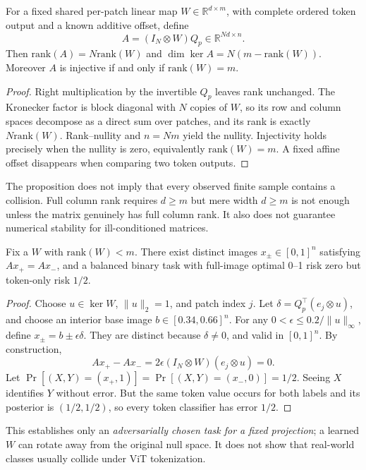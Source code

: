 \begin{proposition}\label{prop:rank}
For a fixed shared per-patch linear map $W\in\mathbb R^{d\times m}$, with complete ordered token output and a known additive offset, define
\begin{equation}\label{eq:operator}
 A=(I_N\otimes W)Q_p\in\mathbb R^{Nd\times n}.
\end{equation}
Then $\mathrm{rank}(A)=N\mathrm{rank}(W)$ and $\dim\ker A=N(m-\mathrm{rank}(W))$. Moreover $A$ is injective if and only if $\mathrm{rank}(W)=m$.
\end{proposition}
\begin{proof}
Right multiplication by the invertible $Q_p$ leaves rank unchanged. The Kronecker factor is block diagonal with $N$ copies of $W$, so its row and column spaces decompose as a direct sum over patches, and its rank is exactly $N\mathrm{rank}(W)$. Rank--nullity and $n=Nm$ yield the nullity. Injectivity holds precisely when the nullity is zero, equivalently $\mathrm{rank}(W)=m$. A fixed affine offset disappears when comparing two token outputs.
\end{proof}
The proposition does not imply that every observed finite sample contains a collision. Full column rank requires $d\ge m$ but mere width $d\ge m$ is not enough unless the matrix genuinely has full column rank. It also does not guarantee numerical stability for ill-conditioned matrices.

\begin{proposition}\label{prop:collision}
Fix a $W$ with $\mathrm{rank}(W)<m$. There exist distinct images $x_\pm\in[0,1]^n$ satisfying $Ax_+=Ax_-$, and a balanced binary task with full-image optimal 0--1 risk zero but token-only risk $1/2$.
\end{proposition}
\begin{proof}
Choose $u\in\ker W$, $\|u\|_2=1$, and patch index $j$. Let $\delta=Q_p^\top(e_j\otimes u)$, and choose an interior base image $b\in[0.34,0.66]^n$. For any $0<\epsilon\le 0.2/\|u\|_\infty$, define $x_\pm=b\pm\epsilon\delta$. They are distinct because $\delta\ne0$, and valid in $[0,1]^n$. By construction,
\begin{equation}\label{eq:collision}
 Ax_+-Ax_-=2\epsilon(I_N\otimes W)(e_j\otimes u)=0.
\end{equation}
Let $\Pr[(X,Y)=(x_+,1)]=\Pr[(X,Y)=(x_-,0)]=1/2$. Seeing $X$ identifies $Y$ without error. But the same token value occurs for both labels and its posterior is $(1/2,1/2)$, so every token classifier has error $1/2$.
\end{proof}
This establishes only an \emph{adversarially chosen task for a fixed projection}; a learned $W$ can rotate away from the original null space. It does not show that real-world classes usually collide under ViT tokenization.

